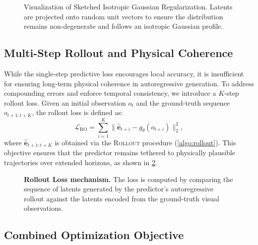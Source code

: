 \begin{figure}
	\begin{center}
		
	\end{center}
	\caption{Visualization of Sketched Isotropic Gaussian Regularization. Latents are projected onto random unit vectors to ensure the distribution remains non-degenerate and follows an isotropic Gaussian profile.}\label{fig:sigreg}
\end{figure}


\subsection{Multi-Step Rollout and Physical Coherence}
\label{sec:ms_roll_phy}

While the single-step predictive loss encourages local accuracy, it is insufficient for ensuring long-term physical coherence in autoregressive generation. To address compounding errors and enforce temporal consistency, we introduce a $K$-step rollout loss. Given an initial observation \( o_t \) and the ground-truth sequence \( o_{t+1:t+K} \), the rollout loss is defined as:
\begin{equation}
	\mathcal{L}_\mathrm{RO} = \sum_{i=1}^{K}{\| \hat{\mathbf{e}}_{t+i} - g_\theta(o_{t+i}) \|^2_2} ,
	\label{eq:loss_rollout}
\end{equation}
where \( \hat{\mathbf{e}}_{t+1:t+K} \) is obtained via the \textsc{Rollout} procedure (\cref{algo:rollout}). This objective ensures that the predictor remains tethered to physically plausible trajectories over extended horizons, as shown in \cref{fig:rollout}.

\begin{figure}
	\begin{center}
		
	\end{center}
	\caption{\textbf{Rollout Loss mechanism.}\; The loss is computed by comparing the sequence of latents generated by the predictor's autoregressive rollout against the latents encoded from the ground-truth visual observations.}\label{fig:rollout}
\end{figure}

\subsection{Combined Optimization Objective}
\label{sec:combined_optimization}

